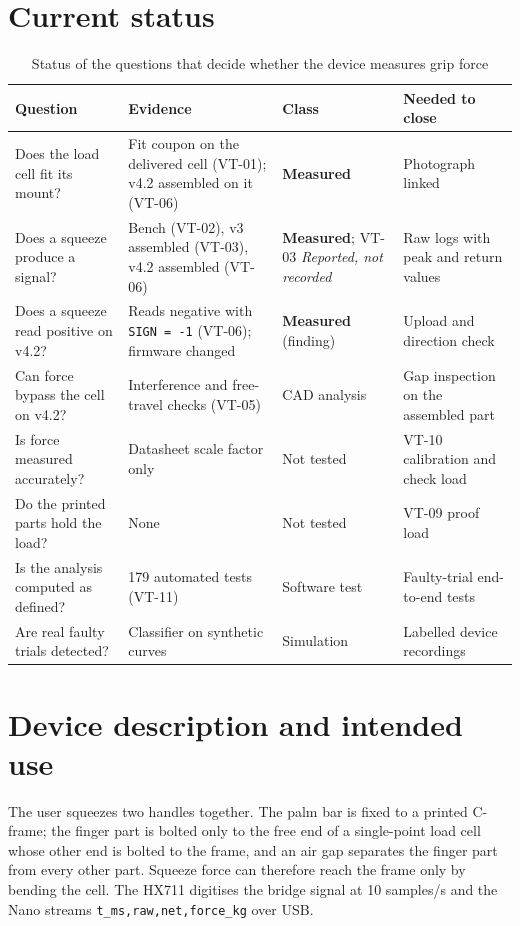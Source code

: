 \documentclass[10pt,a4paper]{article}
\newcommand{\meas}{\textbf{Measured}}
\newcommand{\cadan}{CAD analysis}
\newcommand{\simul}{Simulation}
\newcommand{\swt}{Software test}
\newcommand{\rep}{\textit{Reported, not recorded}}
\newcommand{\nt}{\textcolor{warn}{Not tested}}
\begin{document}
\section{Current status}

\begin{table}[H]
\centering\small
\caption{Status of the questions that decide whether the device measures grip force}
\begin{tabularx}{\linewidth}{@{}P{3.6cm}LP{2.4cm}P{3.3cm}@{}}
\toprule
Question & Evidence & Class & Needed to close \\
\midrule
Does the load cell fit its mount? & Fit coupon on the delivered cell (VT-01); v4.2 assembled on it (VT-06) & \meas & Photograph linked \\
Does a squeeze produce a signal? & Bench (VT-02), v3 assembled (VT-03), v4.2 assembled (VT-06) & \meas; VT-03 \rep & Raw logs with peak and return values \\
Does a squeeze read positive on v4.2? & Reads negative with \texttt{SIGN = -1} (VT-06); firmware changed & \meas{} (finding) & Upload and direction check \\
Can force bypass the cell on v4.2? & Interference and free-travel checks (VT-05) & \cadan & Gap inspection on the assembled part \\
Is force measured accurately? & Datasheet scale factor only & \nt & VT-10 calibration and check load \\
Do the printed parts hold the load? & None & \nt & VT-09 proof load \\
Is the analysis computed as defined? & 179 automated tests (VT-11) & \swt & Faulty-trial end-to-end tests \\
Are real faulty trials detected? & Classifier on synthetic curves & \simul & Labelled device recordings \\
\bottomrule
\end{tabularx}
\end{table}

\section{Device description and intended use}

The user squeezes two handles together. The palm bar is fixed to a printed C-frame; the finger part is bolted only to the free end of a single-point load cell whose other end is bolted to the frame, and an air gap separates the finger part from every other part. Squeeze force can therefore reach the frame only by bending the cell. The HX711 digitises the bridge signal at 10 samples/s and the Nano streams \texttt{t\_ms,raw,net,force\_kg} over USB.
\end{document}
